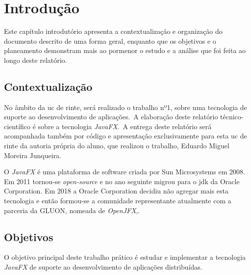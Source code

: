 
\chapter{Introdução} 	%
\label{Chapter1} 		%

Este capítulo introdutório apresenta a  contextualização e organização do documento descrito de uma forma geral, enquanto que os objetivos e o planeamento demonstram mais ao pormenor o estudo e a análise que foi  feita ao longo deste relatório.


\section{Contextualização}
\label{sec:Ch1.1}

\noindent No âmbito da \ac{uc} de \ac{rinte},  será realizado o trabalho nº1, sobre uma tecnologia de suporte ao desenvolvimento de aplicações.~A elaboração deste  relatório técnico-científico é sobre a tecnologia \textit{JavaFX}.~A entrega deste relatório será acompanhada também por código e apresentação exclusivamente para esta \ac{uc} de \ac{rinte} da autoria própria do aluno, que realizou o trabalho, Eduardo Miguel Moreira Junqueira.

\noindent O \textit{JavaFX} é uma plataforma de software criada por Sun Microsystems em 2008. Em 2011 tornou-se \textit{open-source} e no ano seguinte migrou para o \ac{jdk} da Oracle Corporation. Em 2018 a Oracle Corporation decidiu não agregar mais esta tecnologia e então formou-se a comunidade representante atualmente com a parceria da GLUON, nomeada de \textit{OpenJFX}\cite{Pereira2020},\cite{OpenJFX}.%




\section{Objetivos}
\label{sec:Ch1.2}
\noindent O objetivo principal deste trabalho prático é estudar e  implementar a tecnologia \textit{JavaFX} de suporte ao desenvolvimento de aplicações distribuídas.

